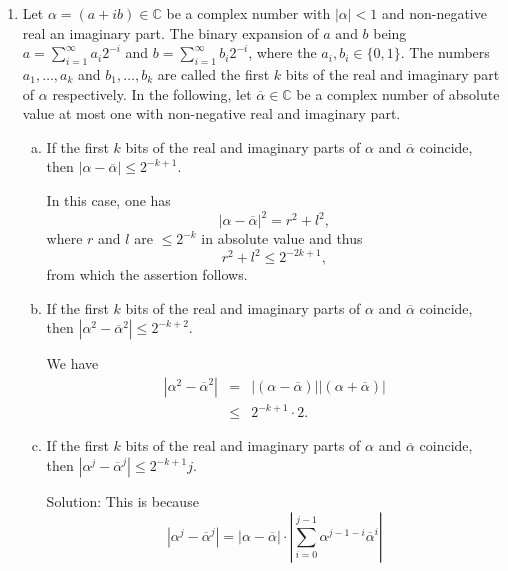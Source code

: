 \documentclass[12pt,a4paper]{article}
\newcommand{\br}[1]{\overline{#1}}
\begin{document}
\begin{enumerate}
\item Let $α = (a + ib)∈ℂ$ be a complex number with $|α|<1$ and non-negative real an imaginary part. The binary expansion of $a$ and $b$ being $a = ∑_{i=1}^∞ a_i 2^{-i}$ and  $b = ∑_{i=1}^∞ b_i 2^{-i}$, where the $a_i, b_i ∈ \{0,1\}$. The numbers $a_1,\dots,a_k$ and $b_1,\dots,b_k$ are called the first $k$ bits of the real and imaginary part of $α$ respectively. In the following, let $\br{α} ∈ℂ$ be a complex number of absolute value at most one with non-negative real and imaginary part.  
  \begin{enumerate}[a)]
  \item If the first $k$ bits of the real and imaginary parts of $α$ and $\br{α}$ coincide, then $|α - \br{α}| ≤2^{-k+1}$.

    In this case, one has
    \begin{displaymath}
      |α - \br{α}|^2 = r ^2 +  l^2,
    \end{displaymath}
    where $r$ and $l$ are $≤ 2^{-k}$ in absolute value and thus
    \begin{displaymath}
       r ^2 +  l^2 ≤ 2^{-2k+1},
     \end{displaymath}
     from which the assertion follows. 
    
   \item If the first $k$ bits of the real and imaginary parts of $α$ and $\br{α}$ coincide, then $|α^2 - \br{α}^2| ≤2^{-k+2}$.

     We have
     \begin{eqnarray*}
       |α^2 - \br{α}^2| & = & |(α - \br{α})| |  ( α + \br{α}) | \\
                        & ≤& 2^{-k+1} ⋅2. 
     \end{eqnarray*}
   \item If the first $k$ bits of the real and imaginary parts of $α$ and $\br{α}$ coincide, then $|α^j - \br{α}^j| ≤2^{-k+1} j$.

     Solution: This is because
     \begin{displaymath}
       |α^j - \br{α}^j| = |α - \br{α}| ⋅ | ∑_{i=0}^{j-1}  α^{j-1-i} \br{α}^i| 
     \end{displaymath}
  \end{enumerate}


\end{enumerate}
\end{document}
